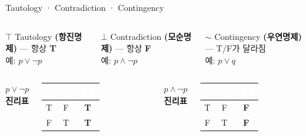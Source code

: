 \documentclass[10.5pt,compress]{beamer}
\newcommand{\Tcell}{\cellcolor{lightgreen!80}\textcolor{codegreen}{\textbf{T}}}
\newcommand{\Fcell}{\cellcolor{lightred!80}\textcolor{codered}{\textbf{F}}}
\begin{document}
\begin{frame}[t]{Tautology · Contradiction · Contingency}
    \footnotesize
    
    \begin{columns}[t, totalwidth=\textwidth] %
    \begin{exampleblock}{$\top$ Tautology}
        \scriptsize\textbf{(항진명제)} --- 항상 \textbf{T}\\
        예: $p \lor \neg p$
    \end{exampleblock}

    \begin{alertblock}{$\bot$ Contradiction}
        \scriptsize\textbf{(모순명제)} --- 항상 \textbf{F}\\
        예: $p \land \neg p$
    \end{alertblock}

    \begin{block}{$\sim$ Contingency}
        \scriptsize\textbf{(우연명제)} --- T/F가 달라짐\\
        예: $p \lor q$
    \end{block}
\end{columns}

    \vspace{0.4cm} %

    \begin{columns}[t, totalwidth=\textwidth]
        \setlength{\tabcolsep}{4pt} %
        
        \centering
        \scriptsize\textbf{$p \lor \neg p$ 진리표}\\[0.1cm]
        \renewcommand{\arraystretch}{1.2}
        \begin{tabular}{|c|c|c|}
            \hline
            \rowcolor{codegreen!70}\textcolor{white}{p} & \textcolor{white}{$\neg$p} & \textcolor{white}{결과} \\ \hline
            T & F & \Tcell \\ \hline
            F & T & \Tcell \\ \hline
        \end{tabular}

        \centering
        \scriptsize\textbf{$p \land \neg p$ 진리표}\\[0.1cm]
        \renewcommand{\arraystretch}{1.2}
        \begin{tabular}{|c|c|c|}
            \hline
            \rowcolor{codered!70}\textcolor{white}{p} & \textcolor{white}{$\neg$p} & \textcolor{white}{결과} \\ \hline
            T & F & \Fcell \\ \hline
            F & T & \Fcell \\ \hline
        \end{tabular}


\end{columns}
\end{frame}
\end{document}
